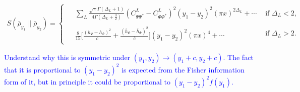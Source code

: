 \documentclass[11pt]{article}
\newcommand{\NL}[1]{\textcolor{blue}{#1}}
\begin{document}
\begin{align}\label{smallxMixture_wrt_mixture}
\boxed{
S(\bar{\rho}_{y_1} \| \bar{\rho}_{y_2} )
=
\begin{cases}
\begin{aligned}
&\sum_L\frac{\sqrt{\pi}\Gamma(\Delta_L+1)}
{4\Gamma(\Delta_L+\frac32)}
(C^L_{\Psi\Psi^*}-C^L_{\Phi\Phi^*})^2
(y_1-y_2)^2(\pi x)^{2\Delta_L}
+\cdots
\end{aligned}
&
\text{if }\Delta_L < 2,
\\[2ex]
\begin{aligned}
&\frac{8}{15}
\Bigg[
\frac{(h_\Psi-h_\Phi)^2}{c} 
+\frac{(\bar h_\Psi-\bar h_\Phi)^2}{\bar c}
\Bigg]
(y_1-y_2)^2(\pi x)^4
+\cdots
\end{aligned}
&
\text{if }\Delta_L>2 .
\end{cases}
}
\end{align}

\NL{Understand why this is symmetric under $(y_1,y_2)\to (y_1+c,y_2+c)$. The fact that it is proportional to $(y_1-y_2)^2$ is expected from the Fisher information form of it, but in principle it could be proportional to $(y_1-y_2)^2 f(y_1)$.}


\end{document}

